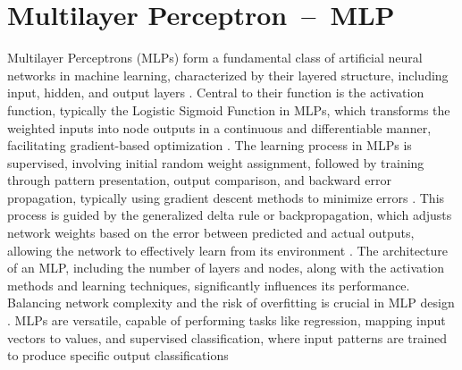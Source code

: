 \section{Multilayer Perceptron~--~MLP}\label{MLP}

Multilayer Perceptrons (MLPs) form a fundamental class of artificial neural networks in machine learning, characterized by their layered structure, including input, hidden, and output layers \citep{noriega2005multilayer, MurtaghMLP}.  Central to their function is the activation function, typically the Logistic Sigmoid Function in MLPs, which transforms the weighted inputs into node outputs in a continuous and differentiable manner, facilitating gradient-based optimization \citep{MurtaghMLP, noriega2005multilayer}. The learning process in MLPs is supervised, involving initial random weight assignment, followed by training through pattern presentation, output comparison, and backward error propagation, typically using gradient descent methods to minimize errors \citep{noriega2005multilayer}. This process is guided by the generalized delta rule or backpropagation, which adjusts network weights based on the error between predicted and actual outputs, allowing the network to effectively learn from its environment \citep{MurtaghMLP}. The architecture of an MLP, including the number of layers and nodes, along with the activation methods and learning techniques, significantly influences its performance. Balancing network complexity and the risk of overfitting is crucial in MLP design \citep{MurtaghMLP}. MLPs are versatile, capable of performing tasks like regression, mapping input vectors to values, and supervised classification, where input patterns are trained to produce specific output classifications \citep{MurtaghMLP}

